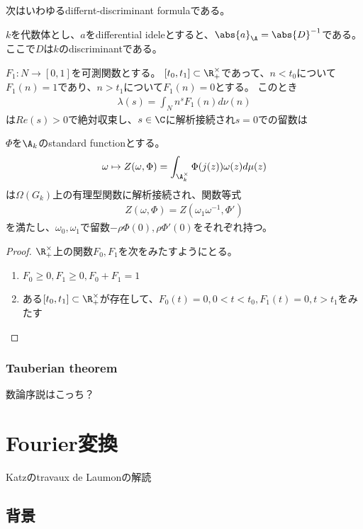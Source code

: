 \documentclass[uplatex, a4paper]{jsbook}
\begin{document}
次はいわゆるdiffernt-discriminant formulaである。
\begin{prop}[Proposition 6, p.113]
$k$を代数体とし、$a$をdifferential ideleとすると、$\abs{a}_{\A}=\abs{D}^{-1}$である。ここで$D$は$k$のdiscriminantである。
\end{prop}

\begin{lem}[Lemma 6, p.121]
$F_1:N \to [0,1]$を可測関数とする。
$[t_0,t_1] \subset \R_+^\times$であって、$n<t_0$について$F_1(n)=1$であり、$n>t_1$について$F_1(n)=0$とする。
このとき
\begin{align*}
\lambda(s)=\int_Nn^sF_1(n)d\nu(n)
\end{align*}
は$Re(s)>0$で絶対収束し、$s\in\C$に解析接続され$s=0$での留数は
\end{lem}

\begin{thm}[Theorem 2, p.121]
$\Phi$を$\A_k$のstandard functionとする。
\begin{align*}
\omega \mapsto Z(\omega, \Phi)=\int_{\A_k^\times}\Phi(j(z))\omega(z)d\mu(z)
\end{align*}
は$\Omega(G_k)$上の有理型関数に解析接続され、関数等式
\begin{align*}
Z(\omega,\Phi)=Z(\omega_1\omega^{-1},\Phi')
\end{align*}
を満たし、$\omega_0, \omega_1$で留数$-\rho\Phi(0), \rho\Phi'(0)$をそれぞれ持つ。
\end{thm}
\begin{proof}
$\R^\times_+$上の関数$F_0, F_1$を次をみたすようにとる。
\begin{enumerate}
\item $F_0\geq0, F_1\geq0, F_0+F_1=1$
\item ある$[t_0,t_1] \subset \R^\times_+$が存在して、$F_0(t)=0, 0<t<t_0, F_1(t)=0, t>t_1$をみたす
\end{enumerate}
\end{proof}

\subsection{Tauberian theorem}
数論序説はこっち？

\chapter{Fourier変換}
Katzのtravaux de Laumonの解読
\section{背景}
\end{document}
